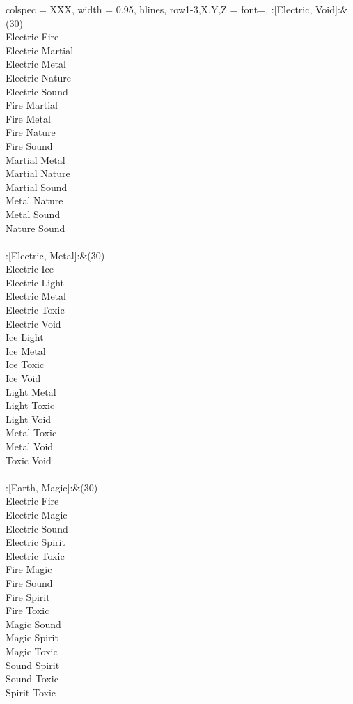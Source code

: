 \begin{longtblr}[
	caption = {2v2 Defending Resisted},
	label = {2v2-Defending-Resisted},
]{
	colspec = {XXX}, width = 0.95\linewidth,
	hlines,
	row{1-3,X,Y,Z} = {font=\bfseries},
}
	:[Electric, Void]:&{(30)\\
	Electric Fire \\
	Electric Martial \\
	Electric Metal \\
	Electric Nature \\
	Electric Sound \\
	Fire Martial \\
	Fire Metal \\
	Fire Nature \\
	Fire Sound \\
	Martial Metal \\
	Martial Nature \\
	Martial Sound \\
	Metal Nature \\
	Metal Sound \\
	Nature Sound \\
	}\\

	:[Electric, Metal]:&{(30)\\
	Electric Ice \\
	Electric Light \\
	Electric Metal \\
	Electric Toxic \\
	Electric Void \\
	Ice Light \\
	Ice Metal \\
	Ice Toxic \\
	Ice Void \\
	Light Metal \\
	Light Toxic \\
	Light Void \\
	Metal Toxic \\
	Metal Void \\
	Toxic Void \\
	}\\

	:[Earth, Magic]:&{(30)\\
	Electric Fire \\
	Electric Magic \\
	Electric Sound \\
	Electric Spirit \\
	Electric Toxic \\
	Fire Magic \\
	Fire Sound \\
	Fire Spirit \\
	Fire Toxic \\
	Magic Sound \\
	Magic Spirit \\
	Magic Toxic \\
	Sound Spirit \\
	Sound Toxic \\
	Spirit Toxic \\
	}\\


\end{longtblr}
